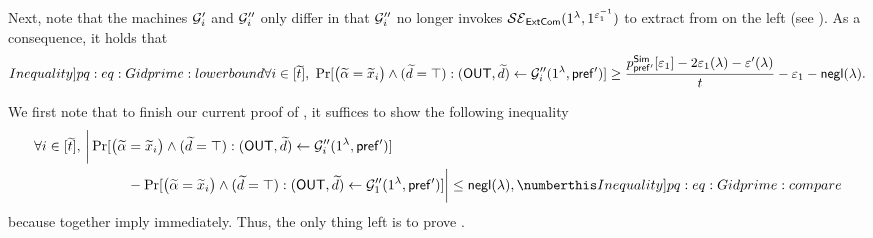  Next, note that the machines $\mathcal{G}_i'$ and $\mathcal{G}_i''$ only differ in that $\mathcal{G}_i''$ no longer invokes $\mathcal{SE}_\mathsf{ExtCom}(1^\lambda, 1^{\varepsilon_1^{-1}})$ to extract from  on the left (see ). As a consequence, it holds that 
\begin{equation}\label[Inequality]{pq:eq:Gidprime:lowerbound}
\forall i \in [\tilde{t}],~\Pr[\big( \tilde{\alpha} = \tilde{x}_i \big)\wedge (\tilde{d} = \top): (\OUT,\tilde{d}) \gets \mcal{G}_i''(1^\secpar, \msf{pref'})] \geq \frac{p^{\msf{Sim}}_{\msf{pref'}}[\epsilon_1] - 2\epsilon_1(\secpar) - \epsilon'(\secpar)}{t} -\epsilon_1 -\negl(\secpar).
\end{equation}

 We first note that to finish our current proof of , it suffices to show the following inequality
 \begin{align*}
        \forall i \in [\tilde{t}],~ & \bigg|  \Pr[\big( \tilde{\alpha} = \tilde{x}_i \big)\wedge (\tilde{d} = \top): (\OUT,\tilde{d}) \gets \mcal{G}_i''(1^\secpar, \msf{pref'})] \\
         & \hspace{3em}- \Pr[\big( \tilde{\alpha} = \tilde{x}_i \big)\wedge (\tilde{d} = \top): (\OUT,\tilde{d}) \gets \mcal{G}_1''(1^\secpar,\msf{pref'})] \bigg| 
         \leq \negl(\secpar), \numberthis \label[Inequality]{pq:eq:Gidprime:compare}
\end{align*} 
because  together imply  immediately. Thus, the only thing left is to prove .

